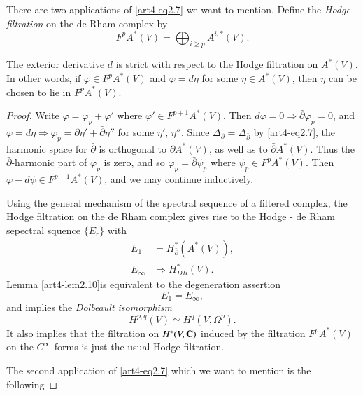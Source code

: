 There are two applications of \eqref{art4-eq2.7} we want to mention. Define the \textit{Hodge filtration} on the de Rham complex by 
$$
F^pA^{\ast} (V) = \bigoplus_{i \geqslant p} A^{i,\ast} (V).
$$

\begin{lemma}\label{art4-lem2.10}
The exterior derivative $d$ is strict with respect to the Hodge filtration on $A^\ast(V)$. In other words, if $\varphi \in F^p A^\ast (V)$ and $\varphi = d\eta$ for some $\eta \in A^\ast (V)$, then $\eta$ can be chosen to lie in $F^p A^\ast(V)$.
\end{lemma}

\begin{proof}
Write $\varphi = \varphi_p + \varphi'$ where $\varphi' \in F^{p+1} A^\ast (V)$. Then $d\varphi = 0 \Rightarrow \bar{\partial}\varphi_p = 0$, and $\varphi = d\eta \Rightarrow \varphi_p = \partial \eta' + \bar{\partial}\eta''$ for some $\eta'$, $\eta''$. Since $\Delta_\partial=\Delta_{\bar{\partial}}$ by \eqref{art4-eq2.7}, the harmonic space for $\bar{\partial}$ is orthogonal to $\partial A^\ast (V)$, as well as to $\bar{\partial} A^\ast (V)$. Thus the $\bar{\partial}$-harmonic part of $\varphi_p$ is zero, and so $\varphi_p = \bar{\partial} \psi_p$ where $\psi_p \in F^p A^\ast (V)$. Then $\varphi - d \psi \in F^{p+1} A^\ast (V)$, and we may continue inductively.

Using the general mechanism of the spectral sequence of a filtered complex, the Hodge filtration on the de Rham complex gives rise to the Hodge - de Rham sepectral squence $\{E_r\}$ with
\begin{align*}
E_1 & = H^{\ast}_{\bar{\partial}} (A^\ast (V)), \\
E_\infty & \Rightarrow H^\ast_{DR} (V).
\end{align*}
Lemma \ref{art4-lem2.10}\pageoriginale  is equivalent to the degeneration assertion
\begin{equation}
E_1 = E_\infty, \label{art4-eq2.11}
\end{equation}
and implies the \textit{Dolbeault isomorphism}
\begin{equation}
H^{p,q} (V) \simeq H^q (V, \Omega^p) .\label{art4-eq2.12}
\end{equation}
It also implies that the filtration on $H^\ast(V, \mathbf{C})$ induced by the filtration $F^p A^\ast (V)$ on the $C^\infty$ forms is just the usual Hodge filtration.

The second application of \eqref{art4-eq2.7} which we want to mention is the following
\end{proof}


